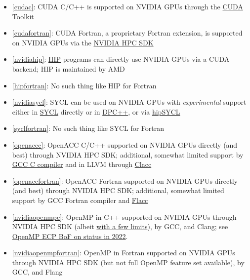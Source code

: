 \begin{frame}[allowframebreaks]
\begin{itemize}
    \ifdefined\tightlist\tightlist\fi%
        \item \ref{cudac}: CUDA C/C++ is supported on NVIDIA GPUs through the \href{https://developer.nvidia.com/cuda-toolkit}{CUDA Toolkit}
        \item \ref{cudafortran}: CUDA Fortran, a proprietary Fortran extension, is supported on NVIDIA GPUs via the \href{https://developer.nvidia.com/hpc-sdk}{NVIDIA HPC SDK}
        \item \ref{nvidiahip}: \href{https://github.com/ROCm-Developer-Tools/HIP}{HIP} programs can directly use NVIDIA GPUs via a CUDA backend; HIP is maintained by AMD
        \item \ref{hipfortran}: No such thing like HIP for Fortran
        \item \ref{nvidiasycl}: SYCL can be used on NVIDIA GPUs with \emph{experimental} support either in \href{https://github.com/codeplaysoftware/sycl-for-cuda/blob/cuda/sycl/doc/GetStartedWithSYCLCompiler.md\#build-sycl-toolchain-with-support-for-nvidia-cuda}{SYCL} directly or in \href{https://github.com/intel/llvm/blob/sycl/sycl/doc/GetStartedGuide.md\#build-dpc-toolchain-with-support-for-nvidia-cuda}{DPC++}, or via \href{https://github.com/illuhad/hipSYCL}{hipSYCL}
        \item \ref{syclfortran}: No such thing like SYCL for Fortran
        \item \ref{openaccc}: OpenACC C/C++ supported on NVIDIA GPUs directly (and best) through NVIDIA HPC SDK; additional, somewhat limited support by \href{https://gcc.gnu.org/wiki/OpenACC}{GCC C compiler} and in LLVM through \href{https://csmd.ornl.gov/project/clacc}{Clacc}
        \item \ref{openaccfortran}: OpenACC Fortran supported on NVIDIA GPUs directly (and best) through NVIDIA HPC SDK; additional, somewhat limited support by GCC Fortran compiler and \href{https://ieeexplore.ieee.org/document/9651310}{Flacc}
        \item \ref{nvidiaopenmpc}: OpenMP in C++ supported on NVIDIA GPUs through NVIDIA HPC SDK (albeit \href{https://docs.nvidia.com/hpc-sdk/compilers/hpc-compilers-user-guide/index.html\#openmp-use}{with a few limits}), by GCC, and Clang; see \href{https://www.openmp.org/wp-content/uploads/2022_ECP_Community_BoF_Days-OpenMP_RoadMap_BoF.pdf}{OpenMP ECP BoF on status in 2022}.
        \item \ref{nvidiaopenmpfortran}: OpenMP in Fortran supported on NVIDIA GPUs through NVIDIA HPC SDK (but not full OpenMP feature set available), by GCC, and Flang

\end{itemize}
\end{frame}
